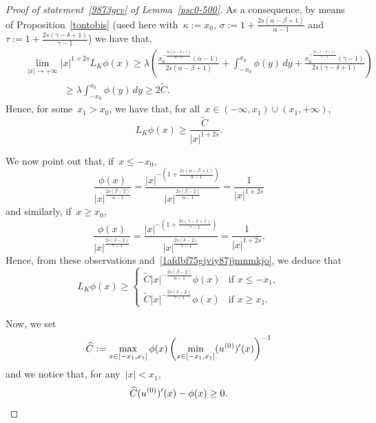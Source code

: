 \documentclass[10pt,a4paper]{amsart}
\numberwithin{equation}{section}
\begin{document}
\begin{proof}[Proof of statement~\eqref{9873grv} of Lemma~\ref{psc0-500}]
As a consequence, by means of Proposition~\ref{tontobis}
(used here with~$\kappa:=x_0$, $\sigma:=1+\frac{2s(\alpha-\beta+1)}{\alpha-1}$ and~$\tau:=1+\frac{2s(\gamma-\delta+1)}{\gamma-1}$)
we have that,  
\begin{eqnarray*} &&\lim_{|x | \to  +\infty} |x|^{1+2s} {L}_K\phi(x) \geq \lambda \left( \frac{x_0^{-
\frac{2s(\alpha-\beta+1)}{\alpha-1}}( \alpha-1)}{2s(\alpha-\beta+1)}+ \int_{-x_0}^{x_0} \phi(y) \, dy+
\frac{x_0^{-\frac{2s(\gamma -\delta+1) }{\gamma-1}}(\gamma-1)}{2s(\gamma -\delta+1)}
\right)\\&&\qquad \qquad \ge
\lambda  \int_{-x_0}^{x_0} \phi(y) \, dy
\ge 2\widetilde{C}.
\end{eqnarray*}
Hence, for some~$x_1>x_0$, we have that, for all~$x\in(-\infty, x_1)\cup(x_1,+\infty)$,
\begin{equation}\label{1afdbf75gjviy87jjmnmkjo} L_K\phi(x)\ge \frac{\widetilde{C}}{|x|^{1+2s}}.\end{equation}

We now point out that, if~$x\le -x_0$,
\begin{equation*}
\frac{\phi(x)}{|x|^{\frac{2s(\beta-2)}{\alpha-1}}}
=\frac{|x |^{-\left(1+\frac{2s(\alpha-\beta+1)}{\alpha-1}\right)}}{|x|^{\frac{2s(\beta-2)}{\alpha-1}}}=\frac1{|x|^{1+2s}}
\end{equation*}
and similarly, if~$x\ge x_0$,
\begin{equation*}
\frac{\phi(x)}{|x|^{\frac{2s(\delta-2)}{\gamma-1}}}
=\frac{|x |^{-\left(1+\frac{2s(\gamma-\delta+1)}{\gamma-1}\right)}}{|x|^{\frac{2s(\delta-2)}{\gamma-1}}}=\frac1{|x|^{1+2s}}.
\end{equation*}
Hence, from these observations and~\eqref{1afdbf75gjviy87jjmnmkjo}, we deduce that
\begin{equation}\label{p48d4d}
	L_K \phi (x) \geq \begin{cases}
\widetilde{C} |x|^{-\frac{2s(\beta-2)}{\alpha-1}} \phi(x) &\mbox{if } x \leq -x_1,\\
\widetilde{C} |x|^{-\frac{2s(\delta-2)}{\gamma-1}} \phi(x) &\mbox{if } x \geq x_1.
\end{cases}
\end{equation}

Now, we set
\begin{equation*}
\widehat{C}:=\max_{x \in [-x_1,x_1]}\phi(x) \left(  \min_{x \in [-x_1,x_1]} (u^{(0)})\rq{} (x)\right)^{-1}
\end{equation*}
and we notice that, for any~$|x | < x_1$,
\begin{equation}\label{546HJHDGILUIDyre65t}
\widehat{C} (u^{(0)})\rq{} (x) - \phi(x)  \geq 0. 
\end{equation}


\end{proof}
\end{document}
